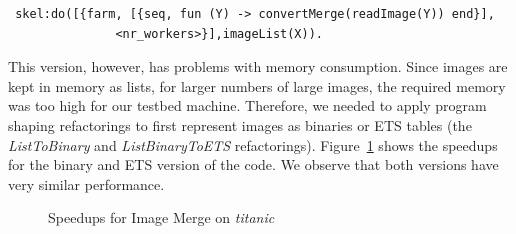 \documentclass[final]{jfp1}
\begin{document}
\begin{lstlisting}
 skel:do([{farm, [{seq, fun (Y) -> convertMerge(readImage(Y)) end}],
               <nr_workers>}],imageList(X)).
\end{lstlisting}

\noindent
This version, however, has problems with memory consumption. Since
images are kept in memory as lists, for
larger numbers of large images, the required memory was too high
for our testbed machine. Therefore, we needed to apply program shaping
refactorings to first represent images as binaries or
ETS tables (the \emph{ListToBinary} and \emph{ListBinaryToETS}
refactorings). 
Figure~\ref{fig:ImageMergeSpeedups} shows the speedups for
the binary and ETS version of the code. We observe that both
versions have very similar
performance.
%
\begin{figure}[t]
\centering
{}
 \caption{Speedups for Image Merge on \emph{titanic}}
 \label{fig:ImageMergeSpeedups}
\end{figure}
\end{document}
